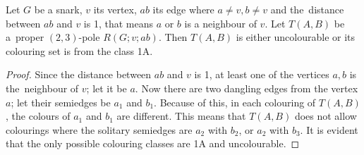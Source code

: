 \begin{proposition}
	Let $G$ be a snark, $v$ its vertex, $ab$ its edge where $a\neq v, b \neq v$ and the~distance between $ab$ and $v$ is 1, that means $a$ or $b$ is a neighbour of $v$. Let $T(A,B)$ be a~proper $(2,3)$-pole $R(G;v;ab)$. Then $T(A,B)$ is either uncolourable or its colouring set is from the class 1A.
	\label{prop:distance-one}
\end{proposition}

\begin{proof}
	Since the distance between $ab$ and $v$ is 1, at least one of the vertices $a,b$ is the~neighbour of $v$; let it be $a$. Now there are two dangling edges from the vertex $a$; let their semiedges be $a_1$ and $b_1$. Because of this, in each colouring of $T(A,B)$, the colours of $a_1$ and $b_1$ are different. This means that $T(A,B)$ does not allow colourings where the solitary semiedges are $a_2$ with $b_2$, or $a_2$ with $b_3$. It is evident that the only possible colouring classes are 1A and uncolourable.
\end{proof}